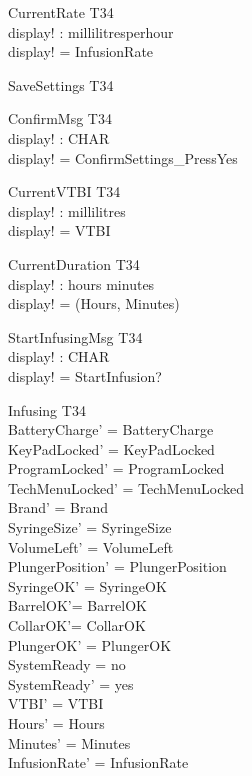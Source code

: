 \documentclass[landscape]{article}
\begin{document}
\begin{schema} {CurrentRate}
\Xi T34\\
display! : millilitresperhour\\
\where
display! = InfusionRate\\
\end{schema}

\begin{schema} {SaveSettings}
\Xi T34
\end{schema}

\begin{schema} {ConfirmMsg}
\Xi T34\\
display! : CHAR\\
\where
display! = ConfirmSettings\_PressYes\\
\end{schema}

\begin{schema} {CurrentVTBI}
\Xi T34\\
display! : millilitres\\
\where
display! = VTBI\\
\end{schema}

\begin{schema} {CurrentDuration}
\Xi T34\\
display! : hours \cross minutes\\
\where
display! = (Hours, Minutes)\\
\end{schema}


\begin{schema} {StartInfusingMsg}
\Xi T34\\
display! : CHAR\\
\where
display! = StartInfusion?\\
\end{schema}

\begin{schema} {Infusing}
\Delta T34\\
\where
BatteryCharge' =  BatteryCharge \\
KeyPadLocked' = KeyPadLocked\\
ProgramLocked' = ProgramLocked \\
TechMenuLocked' = TechMenuLocked\\
Brand' = Brand\\ 
SyringeSize' = SyringeSize\\
VolumeLeft' = VolumeLeft\\
PlungerPosition' = PlungerPosition \\
SyringeOK' = SyringeOK\\
BarrelOK'= BarrelOK\\
CollarOK'= CollarOK\\
PlungerOK' = PlungerOK \\
SystemReady = no\\
SystemReady' = yes\\
VTBI' = VTBI\\
Hours' = Hours\\
Minutes' = Minutes\\
InfusionRate' = InfusionRate\\
\end{schema}
\end{document}
